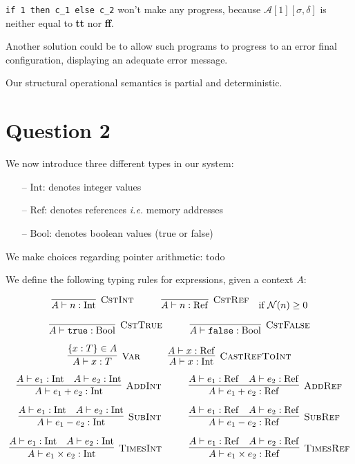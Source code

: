 \documentclass{article}
\newcommand{\Aa}[2]{\mathcal{A}\left[#1\right]\left[#2\right]}
\newcommand{\N}{\mathcal{N}}
\newcommand{\Rule}[3]{\infer[\textsc{#1}]{#2}{#3}}
\newcommand{\Ref}{\mathrm{Ref}}
\newcommand{\Int}{\mathrm{Int}}
\newcommand{\Bool}{\mathrm{Bool}}
\newcommand{\ie}{\emph{i.e.}}
\begin{document}
\texttt{if 1 then c\_1 else c\_2} won't make any progress, because $\Aa{1}{\sigma,\delta}$ is neither equal to \textbf{tt} nor \textbf{ff}.

Another solution could be to allow such programs to progress to an error final configuration, displaying an adequate error message.

Our structural operational semantics is partial and deterministic.

\section*{Question 2}

We now introduce three different types in our system:

\begin{itemize}
	\itemsep0em
	\item[--] $\Int{}$: denotes integer values
	\item[--] $\Ref{}$: denotes references \ie{} memory addresses
	\item[--] $\Bool{}$: denotes boolean values (true or false)
\end{itemize}

We make choices regarding pointer arithmetic: todo

We define the following typing rules for expressions, given a context $A$:

\[
\Rule{CstInt}{A \vdash n: \Int}{}
\hspace*{1cm}
\Rule{CstRef}{A \vdash n: \Ref}{} \quad \text{if $\N(n) \geq 0$}
\]

\[
\Rule{CstTrue}{A \vdash \texttt{true}: \Bool}{}
\hspace*{1cm}
\Rule{CstFalse}{A \vdash \texttt{false}: \Bool}{}
\]

\[
\Rule{Var}{A \vdash x: T}{\lbrace x: T \rbrace \in A}
\hspace*{1cm}
\Rule{CastRefToInt}{A \vdash x: \Int}{A \vdash x: \Ref}
\]

\[
\Rule{AddInt}{A \vdash e_1 + e_2: \Int}{A \vdash e_1: \Int \quad A \vdash e_2: \Int}
\hspace*{1cm}
\Rule{AddRef}{A \vdash e_1 + e_2: \Ref}{A \vdash e_1: \Ref \quad A \vdash e_2: \Ref}
\]

\[
\Rule{SubInt}{A \vdash e_1 - e_2: \Int}{A \vdash e_1: \Int \quad A \vdash e_2: \Int}
\hspace*{1cm}
\Rule{SubRef}{A \vdash e_1 - e_2: \Ref}{A \vdash e_1: \Ref \quad A \vdash e_2: \Ref}
\]

\[
\Rule{TimesInt}{A \vdash e_1 \times e_2: \Int}{A \vdash e_1: \Int \quad A \vdash e_2: \Int}
\hspace*{1cm}
\Rule{TimesRef}{A \vdash e_1 \times e_2: \Ref}{A \vdash e_1: \Ref \quad A \vdash e_2: \Ref}
\]
\end{document}
